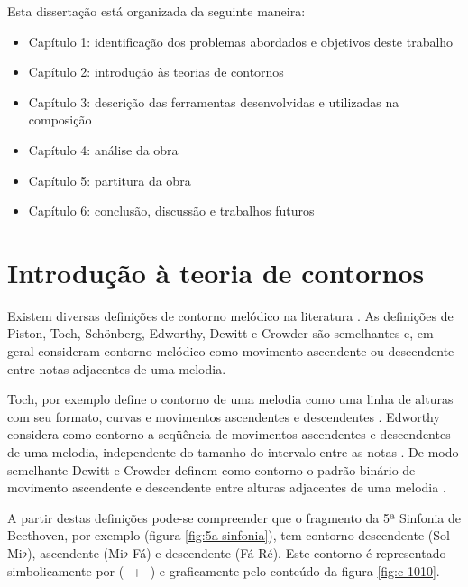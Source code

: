 Esta dissertação está organizada da seguinte maneira:

\begin{itemize}
\item Capítulo 1: identificação dos problemas abordados e objetivos
  deste trabalho
\item Capítulo 2: introdução às teorias de contornos
\item Capítulo 3: descrição das ferramentas desenvolvidas e utilizadas
  na composição
\item Capítulo 4: análise da obra \obra{}
\item Capítulo 5: partitura da obra \obra{}
\item Capítulo 6: conclusão, discussão e trabalhos futuros
\end{itemize}

\chapter{Introdução à teoria de contornos}
\label{cha:introducao-teoria-contornos}

Existem diversas definições de contorno melódico na literatura
\cite{piston59:harmony,toch77:shaping,schonberg:fundamentals,adams76:melodic,edworthy85:musical,dewitt.ea86:recognition,marvin.ea87:relating,morris87:composition,clifford95:contour,beard03:contour}.
As definições de Piston, Toch, Schönberg, Edworthy, Dewitt e Crowder
são semelhantes e, em geral consideram contorno melódico como
movimento ascendente ou descendente entre notas adjacentes de uma
melodia.

Toch, por exemplo define o contorno de uma melodia como uma linha de
alturas com seu formato, curvas e movimentos ascendentes e
descendentes \cite[p. 62]{toch77:shaping}. Edworthy considera como
contorno a seqüência de movimentos ascendentes e descendentes de uma
melodia, independente do tamanho do intervalo entre as notas
\cite{edworthy85:musical}. De modo semelhante Dewitt e Crowder definem
como contorno o padrão binário de movimento ascendente e descendente
entre alturas adjacentes de uma melodia
\cite{dewitt.ea86:recognition}.

A partir destas definições pode-se compreender que o fragmento da 5ª
Sinfonia de Beethoven, por exemplo (figura \ref{fig:5a-sinfonia}), tem
contorno descendente (Sol-Mi$\flat$), ascendente (Mi$\flat$-Fá) e
descendente (Fá-Ré). Este contorno é representado simbolicamente por
(- + -) e graficamente pelo conteúdo da figura \ref{fig:c-1010}.

